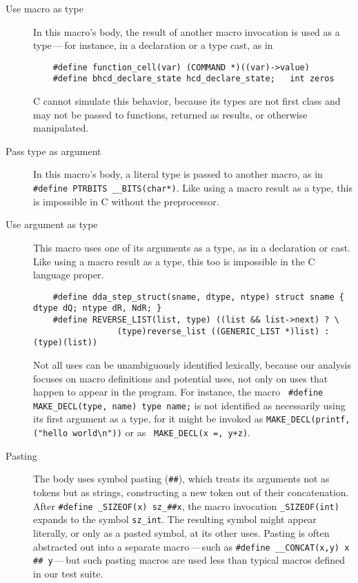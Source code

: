 \documentclass[10pt]{article}
\begin{document}
\begin{description}

\item[Use macro as type]
  In this macro's body, the result of another macro invocation is used as a
  type\,---\,for instance, in a declaration or a type cast, as in 
\begin{verbatim}
    #define function_cell(var) (COMMAND *)((var)->value)
    #define bhcd_declare_state hcd_declare_state;   int zeros
\end{verbatim}
  C cannot
  simulate this behavior, because its types are not first class and may not
  be passed to functions, returned as results, or otherwise manipulated.

\item[Pass type as argument]
  In this macro's body, a literal type is passed to another macro, as in
  {\tt \#define PTRBITS \verb|__BITS|(char*)}.  Like using a macro result
  as a type, this is impossible in C without the preprocessor.

\item[Use argument as type]
  This macro uses one of its arguments as a type, as in a declaration or
  cast.  Like using a macro result as a type, this too is impossible in the
  C language proper.
\begin{verbatim}
    #define dda_step_struct(sname, dtype, ntype) struct sname { dtype dQ; ntype dR, NdR; }
    #define REVERSE_LIST(list, type) ((list && list->next) ? \
                 (type)reverse_list ((GENERIC_LIST *)list) : (type)(list))
\end{verbatim}
  Not all uses can be unambiguously identified lexically, because our
  analysis focuses on macro definitions and potential uses, not only on
  uses that happen to appear in the program.  For instance, the macro {\tt
  \#define \verb|MAKE_DECL|(type, name) type name;} is not identified as
  necessarily using its first argument as a type, for it might be invoked as
  {\tt \verb|MAKE_DECL|(printf, ("hello world\verb|\|n"))} or as {\tt
  \verb|MAKE_DECL|(x =, y+z)}.

\item[Pasting]\label{def:pasting}
  The body uses symbol pasting ({\tt \#\#}), which treats its arguments not
  as tokens but as strings, constructing a new token out of their
  concatenation.  After {\tt \#define \verb|_SIZEOF|(x) \verb|sz_|\#\#x},
  the macro invocation {\tt \verb|_SIZEOF|(int)} expands to the 
  symbol {\tt \verb|sz_int|}.  The resulting symbol might appear literally, or
  only as a pasted symbol, at its other uses.  Pasting is often
  abstracted out into a separate macro\,---\,such as {\tt \#define
  \verb|__CONCAT|(x,y) x \#\# y}\,---\,but such pasting macros are used less
  than typical macros defined in our test suite.


\end{description}
\end{document}
